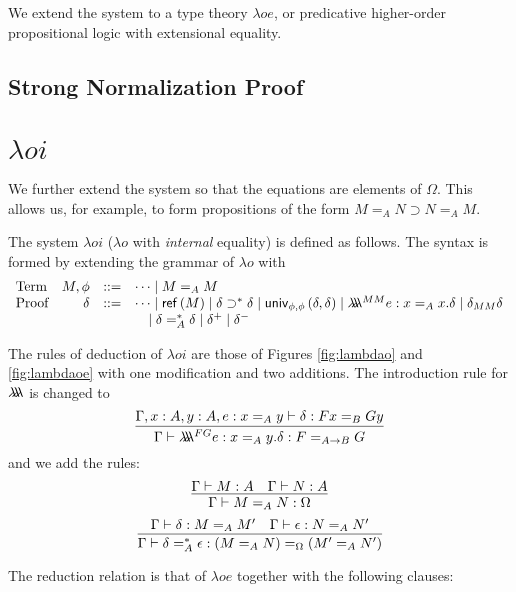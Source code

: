 We extend the system to a type theory $\lambda o e$, or predicative higher-order propositional logic with extensional equality.







\subsection{Strong Normalization Proof}






\section{$\lambda o i$}

We further extend the system so that the equations are elements of $\Omega$.  This allows us, for example,
to form propositions of the form $M =_A N \supset N =_A M$.

The system $\lambda o i$ ($\lambda o$ with \emph{internal} equality) is defined as follows.  The
syntax is formed by extending the grammar of $\lambda o$ with
\[
\begin{array}{lrcl}
\text{Term} & M, \phi & ::= & \cdots \mid M =_A M \\
\text{Proof} & \delta & ::= & \cdots \mid \mathsf{ref} \left( {M} \right) \mid \delta \supset^* \delta \mid \mathsf{univ}_{{\phi} , {\phi}} \left( {\delta} , {\delta} \right) \mid \lambda \!\! \lambda \!\! \lambda^{MM} e : x =_A x . \delta \mid \delta_{MM} \delta\\
& & & \quad \mid \delta =^*_A \delta \mid \delta^+ \mid \delta^-
\end{array}
\]

The rules of deduction of $\lambda o i$ are those of Figures \ref{fig:lambdao} and \ref{fig:lambdaoe} with one modification and two additions.  The introduction rule for $\lambda \!\! \lambda \!\! \lambda$ is changed to %
\[ \infer{\Gamma \vdash \triplelambda^{FG} e : x =_A y . \delta : F =_{A \rightarrow B} G}
{\Gamma, x : A, y : A, e : x =_A y \vdash \delta : F x =_B G y} \]
and we add the rules:
\[ \infer{\Gamma \vdash M =_A N : \Omega}{\Gamma \vdash M : A \quad \Gamma \vdash N : A} \]
\[ \infer{\Gamma \vdash \delta =^*_A \epsilon : (M =_A N) =_\Omega (M' =_A N')}
{\Gamma \vdash \delta : M =_A M' \quad \Gamma \vdash \epsilon : N =_A N'} \]

The reduction relation is that of $\lambda o e$ together with the following clauses:

